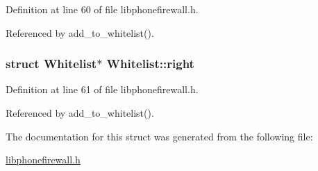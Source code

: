 Definition at line 60 of file libphonefirewall.h.

Referenced by add\_\-to\_\-whitelist().\hypertarget{structWhitelist_2600043be14c3f8e10d3939afe796d58}{
\subsubsection{\setlength{\rightskip}{0pt plus 5cm}struct {\bf Whitelist}$\ast$ {\bf Whitelist::right}}}
\label{structWhitelist_2600043be14c3f8e10d3939afe796d58}




Definition at line 61 of file libphonefirewall.h.

Referenced by add\_\-to\_\-whitelist().

The documentation for this struct was generated from the following file:\begin{CompactItemize}
\item 
\hyperlink{libphonefirewall_8h}{libphonefirewall.h}\end{CompactItemize}
